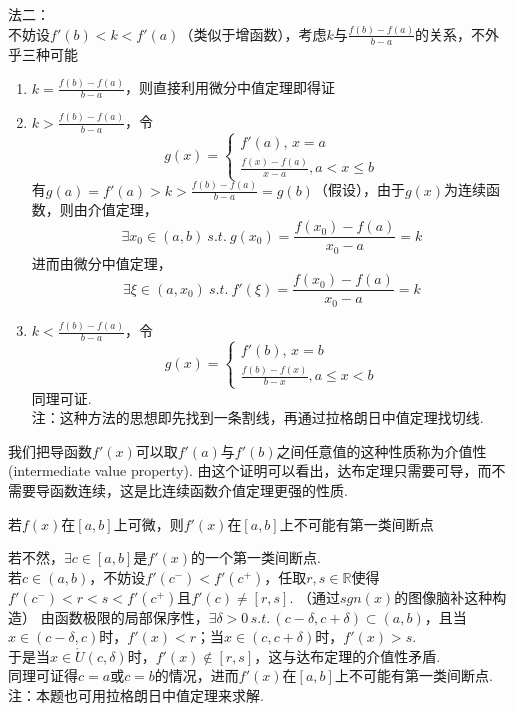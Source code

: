 \begin{analysis}
法二：\\
不妨设$f'(b)<k<f'(a)$（类似于增函数），考虑$k$与$\displaystyle\frac{f(b)-f(a)}{b-a}$的关系，不外乎三种可能
\begin{enumerate}
	\item $k=\displaystyle\frac{f(b)-f(a)}{b-a}$，则直接利用微分中值定理即得证
	\item $k>\displaystyle\frac{f(b)-f(a)}{b-a}$，令
	\[g(x)=\begin{cases}
	f'(a),\,x=a\\
	\displaystyle\frac{f(x)-f(a)}{x-a},a<x\leq b\end{cases}\]
	有$\displaystyle g(a)=f'(a)>k>\frac{f(b)-f(a)}{b-a}=g(b)$（假设），由于$g(x)$为连续函数，则由介值定理，
	\[\exists x_0\in(a,b)\:s.t.\:g(x_0)=\frac{f(x_0)-f(a)}{x_0-a}=k\]
	进而由微分中值定理，
	\[\exists \xi\in(a,x_0)\:s.t.\:f'(\xi)=\frac{f(x_0)-f(a)}{x_0-a}=k\]
	\item $k<\displaystyle\frac{f(b)-f(a)}{b-a}$，令
	\[g(x)=\begin{cases}
	f'(b),\,x=b\\
	\displaystyle\frac{f(b)-f(x)}{b-x},a\leq x<b\end{cases}\]
	同理可证.\\
	注：这种方法的思想即先找到一条割线，再通过拉格朗日中值定理找切线.
\end{enumerate}
\end{analysis}
我们把导函数$f'(x)$可以取$f'(a)$与$f'(b)$之间任意值的这种性质称为介值性(intermediate value property). 由这个证明可以看出，达布定理只需要可导，而不需要导函数连续，这是比连续函数介值定理更强的性质. 
\begin{corollary}
\label{coro1}
若$f(x)$在$[a,b]$上可微，则$f'(x)$在$[a,b]$上不可能有第一类间断点
\end{corollary}
\begin{analysis}
若不然，$\exists c\in[a,b]$是$f'(x)$的一个第一类间断点.\\
若$c\in(a,b)$，不妨设$f'(c^-)<f'(c^+)$，任取$r,s\in\mathbb{R}$使得$f'(c^-)<r<s<f'(c^+)$且$f'(c)\ne [r,s]$. （通过$sgn(x)$的图像脑补这种构造）
由函数极限的局部保序性，$\exists\delta>0\,s.t.\,(c-\delta,c+\delta)\subset(a,b)$，且当$x\in(c-\delta,c)$时，$f'(x)<r$；当$x\in(c,c+\delta)$时，$f'(x)>s$.\\
于是当$x\in\mathring{U}(c,\delta)$时，$f'(x)\notin[r,s]$，这与达布定理的介值性矛盾.\\
同理可证得$c=a$或$c=b$的情况，进而$f'(x)$在$[a,b]$上不可能有第一类间断点.\\
注：本题也可用拉格朗日中值定理来求解.
\end{analysis}
